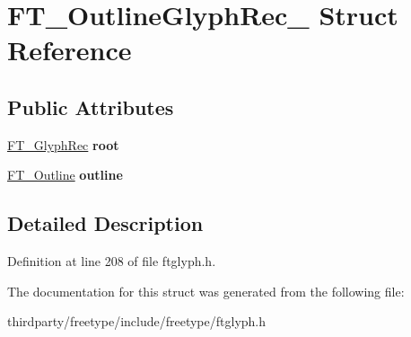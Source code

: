 \hypertarget{struct_f_t___outline_glyph_rec__}{}\section{F\+T\+\_\+\+Outline\+Glyph\+Rec\+\_\+ Struct Reference}
\label{struct_f_t___outline_glyph_rec__}
\subsection*{Public Attributes}
\begin{DoxyCompactItemize}
\item 
\mbox{\label{struct_f_t___outline_glyph_rec___a71e5a8d5fe69e0cea68c96486dd6713f}} 
\hyperlink{struct_f_t___glyph_rec__}{F\+T\+\_\+\+Glyph\+Rec} {\bfseries root}
\item 
\mbox{\label{struct_f_t___outline_glyph_rec___af1bd473a32fcbc500edcfcf89e3ac8ac}} 
\hyperlink{struct_f_t___outline__}{F\+T\+\_\+\+Outline} {\bfseries outline}
\end{DoxyCompactItemize}


\subsection{Detailed Description}


Definition at line 208 of file ftglyph.\+h.



The documentation for this struct was generated from the following file\+:\begin{DoxyCompactItemize}
\item 
thirdparty/freetype/include/freetype/ftglyph.\+h\end{DoxyCompactItemize}
